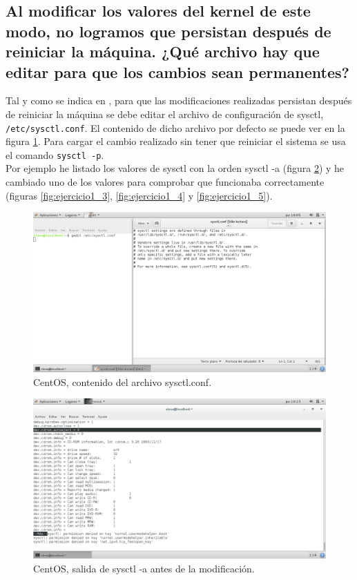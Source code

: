 \subsection{Al modificar los valores del kernel de este modo, no logramos que persistan después de reiniciar la máquina. ¿Qué archivo hay que editar para que los cambios sean permanentes?}

Tal y como se indica en \cite{sysctl}, para que las modificaciones realizadas persistan después de reiniciar la máquina se debe editar el archivo de configuración de sysctl, \texttt{/etc/sysctl.conf}. El contenido de dicho archivo por defecto se puede ver en la figura \ref{fig:ejercicio1_1}. Para cargar el cambio realizado sin tener que reiniciar el sistema se usa el comando \texttt{sysctl ­-p}.\\

Por ejemplo he listado los valores de sysctl con la orden sysctl -a (figura \ref{fig:ejercicio1_2}) y he cambiado uno de los valores para comprobar que funcionaba correctamente (figuras \ref{fig:ejercicio1_3}, \ref{fig:ejercicio1_4} y \ref{fig:ejercicio1_5}).

\begin{figure}[H] 
	\centering
	\includegraphics[width=14.7cm]{./img/ejercicio1_1.png} 	
	\caption{CentOS, contenido del archivo sysctl.conf.} \label{fig:ejercicio1_1}
\end{figure}

\begin{figure}[H] 
	\centering
	\includegraphics[width=14.7cm]{./img/ejercicio1_2.png} 	
	\caption{CentOS, salida de sysctl -a antes de la modificación.} \label{fig:ejercicio1_2}
\end{figure}

